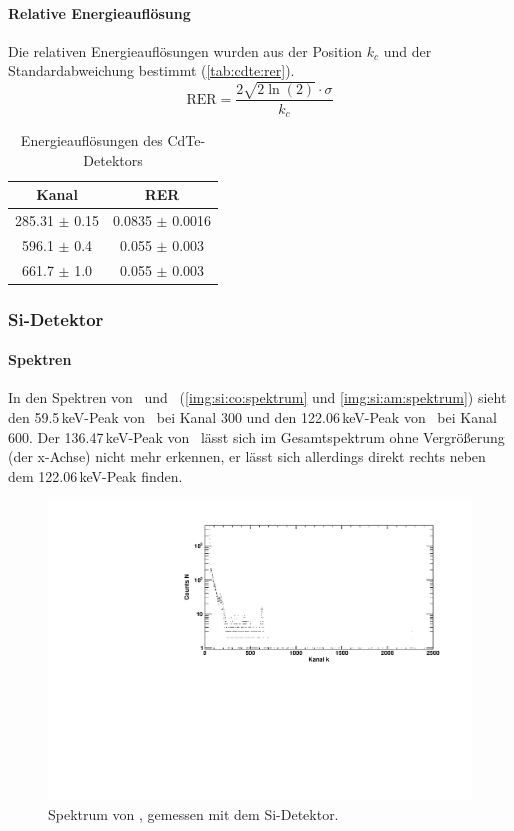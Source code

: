 \paragraph{Relative Energieauflösung}
Die relativen Energieauflösungen wurden aus der Position $k_c$ und der Standardabweichung bestimmt (\autoref{tab:cdte:rer}). 
\begin{equation}
  \label{eq:rer}
  \text{RER} = \frac{2 \sqrt{2 \ln(2)} \cdot \sigma}{k_c} 
\end{equation}
\begin{table}[H]
\begin{center}
\begin{tabular}{|c|c|}
\hline 
Kanal & RER \\ \hline
285.31 $\pm$ 0.15 & 0.0835 $\pm$ 0.0016\\ \hline
596.1 $\pm$ 0.4 & 0.055 $\pm$ 0.003 \\ \hline
661.7 $\pm$ 1.0 & 0.055 $\pm$ 0.003 \\ \hline
\end{tabular}
\caption{Energieauflösungen des CdTe-Detektors}
\label{tab:cdte:rer}
\end{center}
\end{table}

\subsubsection{Si-Detektor}
\paragraph{Spektren}
In den Spektren von \co\ und \am\ (\autoref{img:si:co:spektrum} und \autoref{img:si:am:spektrum}) sieht den 59.5\,keV-Peak 
von \am\, bei Kanal 300 und den 122.06\,keV-Peak von \co\, bei Kanal 600. Der 136.47\,keV-Peak von \co\, lässt sich im Gesamtspektrum 
ohne Vergrößerung (der x-Achse) nicht mehr erkennen, er lässt sich allerdings direkt rechts neben dem 122.06\,keV-Peak finden.
\begin{figure}[H]
\begin{center}
  \includegraphics[width=\textwidth]{../img/part3/Co-Si_spectrum.pdf}
  \caption{Spektrum von \co, gemessen mit dem Si-Detektor.}
  \label{img:si:co:spektrum}
\end{center}
\end{figure}

